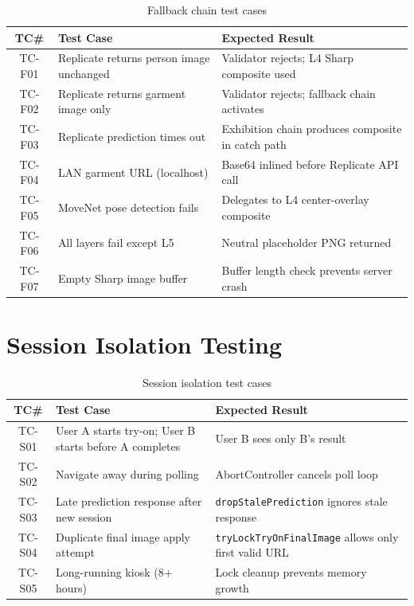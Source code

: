 \begin{table}[H]
  \centering
  \caption{Fallback chain test cases}
  \label{tab:fallback-tests}
  \small
  \begin{tabular}{@{}cp{5cm}p{5.5cm}@{}}
    \toprule
    \textbf{TC\#} & \textbf{Test Case} & \textbf{Expected Result} \\
    \midrule
    TC-F01 & Replicate returns person image unchanged & Validator rejects; L4 Sharp composite used \\
    TC-F02 & Replicate returns garment image only & Validator rejects; fallback chain activates \\
    TC-F03 & Replicate prediction times out & Exhibition chain produces composite in catch path \\
    TC-F04 & LAN garment URL (localhost) & Base64 inlined before Replicate API call \\
    TC-F05 & MoveNet pose detection fails & Delegates to L4 center-overlay composite \\
    TC-F06 & All layers fail except L5 & Neutral placeholder PNG returned \\
    TC-F07 & Empty Sharp image buffer & Buffer length check prevents server crash \\
    \bottomrule
  \end{tabular}
\end{table}

\section{Session Isolation Testing}
\label{sec:session-tests}

\begin{table}[H]
  \centering
  \caption{Session isolation test cases}
  \label{tab:session-tests}
  \small
  \begin{tabular}{@{}cp{5cm}p{5.5cm}@{}}
    \toprule
    \textbf{TC\#} & \textbf{Test Case} & \textbf{Expected Result} \\
    \midrule
    TC-S01 & User A starts try-on; User B starts before A completes & User B sees only B's result \\
    TC-S02 & Navigate away during polling & AbortController cancels poll loop \\
    TC-S03 & Late prediction response after new session & \texttt{dropStalePrediction} ignores stale response \\
    TC-S04 & Duplicate final image apply attempt & \texttt{tryLockTryOnFinalImage} allows only first valid URL \\
    TC-S05 & Long-running kiosk (8+ hours) & Lock cleanup prevents memory growth \\
    \bottomrule
  \end{tabular}
\end{table}

